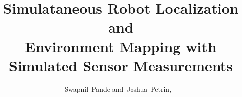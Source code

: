 \documentclass[journal]{IEEEtran}
\begin{document}
%
\title{Simulataneous Robot Localization and \\Environment Mapping with \\Simulated Sensor Measurements}
%
%
%

\author{Swapnil~Pande
        and~Joshua~Petrin,
        ~%
}

% 
%
\end{document}
